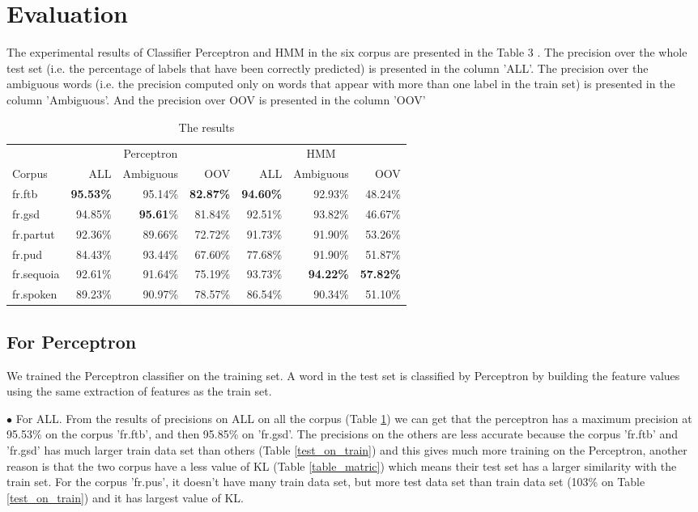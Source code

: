 \documentclass{article}
\begin{document}
\section{Evaluation}
The experimental results of Classifier Perceptron and HMM in the six corpus are presented in the Table 3 . The precision over the whole test set (i.e. the percentage of labels that have been correctly predicted) is presented in the column 'ALL'. The precision over the ambiguous words (i.e. the precision computed only on words that appear with more than one label in the train set) is presented in the column 'Ambiguous'. And the precision over OOV is presented in the column 'OOV'


\begin{table}[h]
\caption{The results}
\vspace{5pt}
\centering
    
\begin{tabular}{|l|rrr|rrr|}
\hline
\multicolumn{1}{|c|}{\ } & \multicolumn{3}{c|}{Perceptron} & \multicolumn{3}{c|}{HMM}\\ 
\cline{2-7}
Corpus & ALL & Ambiguous & OOV & ALL & Ambiguous & OOV\\
\hline
fr.ftb     & \textbf{95.53\%} & 95.14\% & \textbf{82.87\%} & \textbf{94.60\%} & 92.93\% & 48.24\% \\
fr.gsd     & 94.85\% & \textbf{95.61}\% & 81.84\% & 92.51\% & 93.82\% & 46.67\% \\
fr.partut  & 92.36\% & 89.66\% & 72.72\% & 91.73\% & 91.90\% & 53.26\% \\
fr.pud     & 84.43\% & 93.44\% & 67.60\% & 77.68\% & 91.90\% & 51.87\% \\
fr.sequoia & 92.61\% & 91.64\% & 75.19\% & 93.73\% & \textbf{94.22\%} & \textbf{57.82\%} \\
fr.spoken  & 89.23\% & 90.97\% & 78.57\% & 86.54\% & 90.34\% & 51.10\% \\
\hline
\end{tabular}
\label{results}
\end{table}


\subsection{For Perceptron}
We trained the Perceptron classifier on the training set. A word in the test set is classified by Perceptron by  building the feature values using the same extraction of features as the train set. 


$\bullet$ For ALL. From the results of precisions on ALL on all the corpus (Table \ref{results}) we can get that the perceptron has a maximum precision at 95.53\% on the corpus 'fr.ftb', and then 95.85\% on 'fr.gsd'. The precisions on the others are less accurate because the corpus 'fr.ftb' and 'fr.gsd' has much larger train data set than others (Table \ref{test_on_train}) and this gives much more training on the Perceptron, another reason is that the two corpus have a less value of KL (Table \ref{table_matric}) which means their test set has a larger similarity with the train set. For the corpus 'fr.pus', it doesn't have many train data set, but more test data set than train data set (103\% on Table \ref{test_on_train}) and it has largest value of KL.
\end{document}
